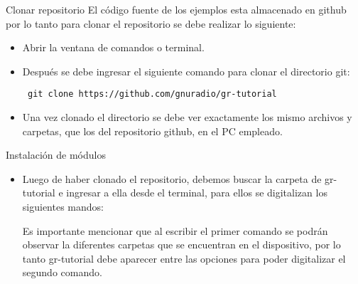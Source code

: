

\begin{frame}{Clonar repositorio}
El c\'odigo fuente de los ejemplos esta almacenado en github por lo tanto para clonar el repositorio se debe realizar lo siguiente:
\begin{itemize}
\item Abrir la ventana de comandos o terminal.
\item Despu\'es se debe ingresar el siguiente comando para clonar el directorio git:

\begin{block}{}
  \texttt{
    git clone https://github.com/gnuradio/gr-tutorial}
  \end{block}

\item Una vez clonado el directorio se debe ver exactamente los mismo archivos y carpetas, que los del repositorio github, en el PC empleado.
\end{itemize}
\end{frame}


\begin{frame}{Instalaci\'on de m\'odulos}
\begin{itemize}
\item Luego de haber clonado el repositorio, debemos buscar la carpeta de gr-tutorial e ingresar a ella desde el terminal, para ellos se digitalizan los siguientes mandos:


Es importante mencionar que al escribir el primer comando se podr\'an observar la diferentes carpetas que se encuentran en el dispositivo, por lo tanto gr-tutorial debe aparecer entre las opciones para poder digitalizar el segundo comando. 
\end{itemize}
\end{frame}


